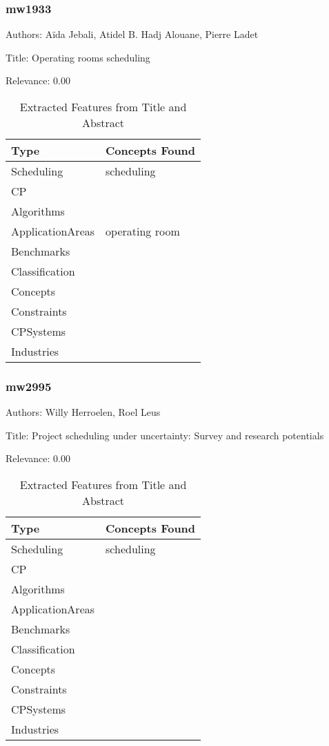 \subsubsection{mw1933}
\label{mw:mw1933}

Authors: Aïda Jebali, Atidel B. Hadj Alouane, Pierre Ladet

Title: Operating rooms scheduling

Relevance:  0.00

{\scriptsize
\begin{longtable}{p{2cm}p{20cm}}
\caption{Extracted Features from Title and Abstract}\\ \toprule
Type & Concepts Found\\ \midrule
\endhead
\bottomrule
\endfoot
Scheduling & scheduling\\ 
CP & \\ 
Algorithms & \\ 
ApplicationAreas & operating room\\ 
Benchmarks & \\ 
Classification & \\ 
Concepts & \\ 
Constraints & \\ 
CPSystems & \\ 
Industries & \\ 
\end{longtable}
}



\subsubsection{mw2995}
\label{mw:mw2995}

Authors: Willy Herroelen, Roel Leus

Title: Project scheduling under uncertainty: Survey and research potentials

Relevance:  0.00

{\scriptsize
\begin{longtable}{p{2cm}p{20cm}}
\caption{Extracted Features from Title and Abstract}\\ \toprule
Type & Concepts Found\\ \midrule
\endhead
\bottomrule
\endfoot
Scheduling & scheduling\\ 
CP & \\ 
Algorithms & \\ 
ApplicationAreas & \\ 
Benchmarks & \\ 
Classification & \\ 
Concepts & \\ 
Constraints & \\ 
CPSystems & \\ 
Industries & \\ 
\end{longtable}
}



